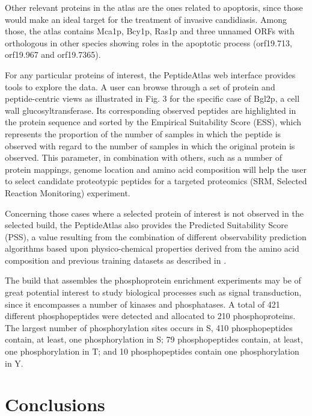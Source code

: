 Other relevant proteins in the atlas are the ones related to
apoptosis, since those would make an ideal target for the
treatment of invasive candidiasis. Among those, the atlas
contains Mca1p, Bcy1p, Ras1p and three unnamed ORFs with
orthologous in other species showing roles in the apoptotic
process (orf19.713, orf19.967 and orf19.7365).

For any particular proteins of interest, the PeptideAtlas
web interface provides tools to explore the data. A user can
browse through a set of protein and peptide-centric views as
illustrated in Fig. 3 for the specific case of Bgl2p, a cell wall
glucosyltransferase. Its corresponding observed peptides are
highlighted in the protein sequence and sorted by the
Empirical Suitability Score (ESS), which represents the proportion
 of the number of samples in which the peptide is
observed with regard to the number of samples in which the
original protein is observed. This parameter, in combination
with others, such as a number of protein mappings, genome
location and amino acid composition will help the user to
select candidate proteotypic peptides for a targeted proteomics
 (SRM, Selected Reaction Monitoring) experiment.

Concerning those cases where a selected protein of
interest is not observed in the selected build, the PeptideAtlas
also provides the Predicted Suitability Score (PSS), a value
resulting from the combination of different observability
prediction algorithms based upon physico-chemical properties
 derived from the amino acid composition and previous
training datasets as described in \citep{Mallick2007}.

The build that assembles the phosphoprotein enrichment
experiments may be of great potential interest to study biological
processes such as signal transduction, since it encompasses a
number of kinases and phosphatases. A total of 421 different
phosphopeptides were detected and allocated to 210 phosphoproteins.
 The largest number of phosphorylation sites occurs in S,
410 phosphopeptides contain, at least, one phosphorylation in S;
79 phosphopeptides contain, at least, one phosphorylation in T;
and 10 phosphopeptides contain one phosphorylation in Y.


\section*{Conclusions}

